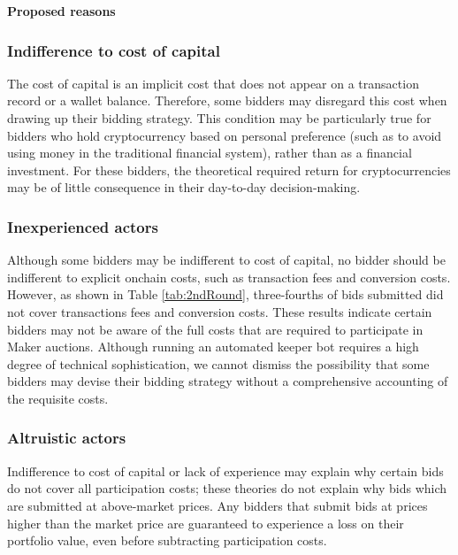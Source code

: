 \documentclass[conference]{IEEEtran}
\begin{document}
\setcounter{subsubsection}{0}

\noindent \textbf{Proposed reasons}
\subsubsection{Indifference to cost of capital} The cost of capital is an implicit cost that does not appear on a transaction record or a wallet balance. Therefore, some bidders may disregard this cost when drawing up their bidding strategy. This condition may be particularly true for bidders who hold cryptocurrency based on personal preference (such as to avoid using money in the traditional financial system), rather than as a financial investment. For these bidders, the theoretical required return for cryptocurrencies may be of little consequence in their day-to-day decision-making.

\subsubsection{Inexperienced actors} Although some bidders may be indifferent to cost of capital, no bidder should be indifferent to explicit onchain costs, such as transaction fees and conversion costs.  However, as shown in Table \ref{tab:2ndRound}, three-fourths of bids submitted did not cover transactions fees and conversion costs. These results indicate certain bidders may not be aware of the full costs that are required to participate in Maker auctions. Although running an automated keeper bot requires a high degree of technical sophistication, we cannot dismiss the possibility that some bidders may devise their bidding strategy without a comprehensive accounting of the requisite costs.

\subsubsection{Altruistic actors} Indifference to cost of capital or lack of experience may explain why certain bids do not cover all participation costs; these theories do not explain why bids which are submitted at above-market prices. Any bidders that submit bids at prices higher than the market price are guaranteed to experience a loss on their portfolio value, even before subtracting participation costs.
    
\end{document}
